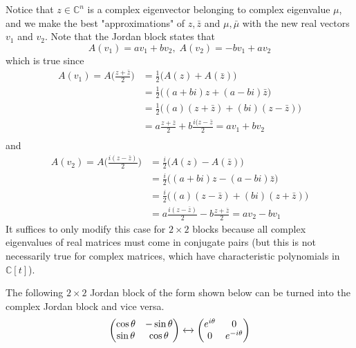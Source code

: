   Notice that $z \in \mathbb{C}^n$ is a complex eigenvector belonging to complex eigenvalue $\mu$, and we make the best "approximations" of $z, \bar{z}$ and $\mu, \bar{\mu}$ with the new real vectors $v_1$ and $v_2$. Note that the Jordan block states that
  \[A(v_1) = a v_1 + b v_2, \; A(v_2) = -b v_1 + a v_2\]
  which is true since 
  \begin{align*}
      A(v_1) = A\Big( \frac{z + \bar{z}}{2} \Big) & = \frac{1}{2} \big( A(z) + A(\bar{z}) \big) \\
      & = \frac{1}{2}\big( (a+bi)z + (a-bi) \bar{z} \big) \\
      & = \frac{1}{2} \big( (a)(z + \bar{z}) + (bi) (z - \bar{z})\big) \\
      & = a \frac{z + \bar{z}}{2} + b \frac{i(z-\bar{z}}{2} = a v_1 + b v_2 \\
  \end{align*}
  and 
  \begin{align*}
      A(v_2) = A \Big( \frac{i(z-\bar{z})}{2} \Big) & = \frac{i}{2} \big( A(z) - A(\bar{z}) \big) \\
      & = \frac{i}{2} \big( (a+bi) z - (a-bi) \bar{z}\big) \\
      & = \frac{i}{2} \big( (a) (z - \bar{z}) + (bi)(z+\bar{z})\big) \\
      & = a \frac{i(z-\bar{z})}{2} - b \frac{z + \bar{z}}{2} = a v_2 - b v_1
  \end{align*}
  It suffices to only modify this case for $2 \times 2$ blocks because all complex eigenvalues of real matrices must come in conjugate pairs (but this is not necessarily true for complex matrices, which have characteristic polynomials in $\mathbb{C}[t]$). 

  \begin{corollary}
    The following $2 \times 2$ Jordan block of the form shown below can be turned into the complex Jordan block and vice versa. 
    \[\begin{pmatrix}
    \cos{\theta} & -\sin{\theta} \\
    \sin{\theta} & \cos{\theta} 
    \end{pmatrix} \xleftrightarrow{} \begin{pmatrix}
    e^{i \theta} & 0 \\
    0 & e^{- i \theta}
    \end{pmatrix}\]
  \end{corollary}

